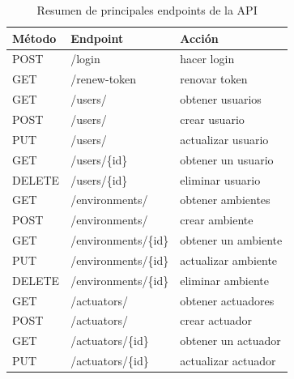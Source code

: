 \begin{table}[H]
    \centering
    \caption[Resumen de principales endpoints de la API]{Resumen de principales endpoints de la API}
    \begin{tabular}{l l l}
        \toprule
        \textbf{Método} & \textbf{Endpoint}                  & \textbf{Acción}        \\
        \midrule
        POST            & /login                             & hacer login            \\
        GET             & /renew-token                       & renovar token          \\
        \midrule
        GET             & /users/                            & obtener usuarios       \\
        POST            & /users/                            & crear usuario          \\
        PUT             & /users/                            & actualizar usuario     \\
        GET             & /users/\{id\}                      & obtener un usuario     \\
        DELETE          & /users/\{id\}                      & eliminar usuario       \\
        \midrule
        GET             & /environments/                     & obtener ambientes      \\
        POST            & /environments/                     & crear ambiente         \\
        GET             & /environments/\{id\}               & obtener un ambiente    \\
        PUT             & /environments/\{id\}               & actualizar ambiente    \\
        DELETE          & /environments/\{id\}               & eliminar ambiente      \\
        \midrule
        GET             & /actuators/                        & obtener actuadores     \\
        POST            & /actuators/                        & crear actuador         \\
        GET             & /actuators/\{id\}                  & obtener un actuador    \\
        PUT             & /actuators/\{id\}                  & actualizar actuador    \\

\end{tabular}
\end{table}

